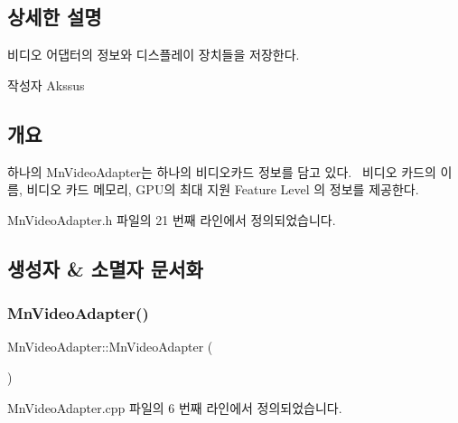 \subsection{상세한 설명}
비디오 어댑터의 정보와 디스플레이 장치들을 저장한다. 

\begin{DoxyAuthor}{작성자}
Akssus 
\end{DoxyAuthor}
\hypertarget{class_m_n_l_1_1_mn_video_adapter_개요}{}\subsection{개요}\label{class_m_n_l_1_1_mn_video_adapter_개요}
하나의 Mn\+Video\+Adapter는 하나의 비디오카드 정보를 담고 있다.~\newline
비디오 카드의 이름, 비디오 카드 메모리, G\+P\+U의 최대 지원 Feature Level 의 정보를 제공한다.~\newline


Mn\+Video\+Adapter.\+h 파일의 21 번째 라인에서 정의되었습니다.



\subsection{생성자 \& 소멸자 문서화}
\mbox{\label{class_m_n_l_1_1_mn_video_adapter_ac70ef4ef6b81876705d05ce05818b6da}} 
\subsubsection{\texorpdfstring{Mn\+Video\+Adapter()}{MnVideoAdapter()}}
{\footnotesize\ttfamily Mn\+Video\+Adapter\+::\+Mn\+Video\+Adapter (\begin{DoxyParamCaption}{ }\end{DoxyParamCaption})}



Mn\+Video\+Adapter.\+cpp 파일의 6 번째 라인에서 정의되었습니다.

\mbox{\label{class_m_n_l_1_1_mn_video_adapter_a4248956c1f9981df00d983f55956930a}} 
